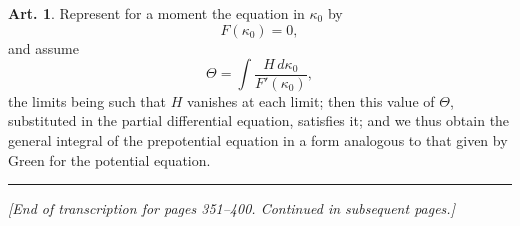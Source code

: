 \documentclass[12pt,a4paper]{article}
\theoremstyle{definition}
\newtheorem{art}{Art.}[section]
\begin{document}
\begin{art}\label{art:125}
Represent for a moment the equation in $\kappa_0$ by
\[
F(\kappa_0) = 0,
\]
and assume
\[
\Theta = \int \frac{H \, d\kappa_0}{F'(\kappa_0)},
\]
the limits being such that $H$ vanishes at each limit; then this value of $\Theta$, substituted in the partial differential equation, satisfies it; and we thus obtain the general integral of the prepotential equation in a form analogous to that given by Green for the potential equation.
\end{art}

\vspace{1cm}
\begin{center}
\rule{0.5\textwidth}{0.4pt}
\end{center}

\vspace{0.5cm}
\noindent\textit{[End of transcription for pages 351--400. Continued in subsequent pages.]}
\end{document}
